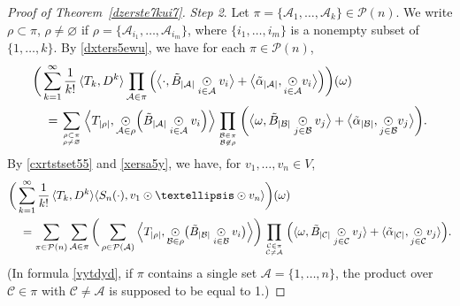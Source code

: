 \documentclass[10pt,a4paper]{amsart}
\begin{document}
\begin{proof}[Proof of Theorem~\ref{dzerste7kui7}]
{\it Step 2}. Let $\pi=\{\mathcal A_1,\dots,\mathcal A_k\}\in\mathcal P(n)$. We write $\rho\subset\pi$, $\rho\ne\varnothing$ if $\rho=\{\mathcal A_{i_1},\dots,\mathcal A_{i_m}\}$, where $\{i_1,\dots,i_m\}$ is a nonempty subset of $\{1,\dots,k\}$. By \eqref{dxters5ewu}, we have for each $\pi\in\mathcal P(n)$,
\begin{align}
&\bigg(\sum_{k=1}^\infty \frac 1{k!}\,\langle T_k, D^{k}\rangle \prod_{\mathcal A\in\pi}\Big(
\big\langle \cdot,\tilde B_{|\mathcal A|}\underset{i\in \mathcal A}\odot v_i\big\rangle+\big\langle \tilde\alpha_{|\mathcal A|},\underset{i\in \mathcal A}\odot v_i\big\rangle\Big)\bigg)(\omega)\notag\\
&\quad=\sum_{\rho\subset\pi\atop \rho\ne\varnothing}\Big\langle T_{|\rho|},
\underset{\mathcal A\in\rho}\odot\Big(\tilde B_{|\mathcal A|} \underset{i\in\mathcal A}\odot v_i\Big)\Big\rangle
\prod_{\mathcal B\in\pi\atop\mathcal B\not\in \rho}
\bigg(
\big\langle \omega,\tilde B_{|\mathcal B|}\underset{j\in \mathcal B}\odot v_j\big\rangle+\big\langle \tilde\alpha_{|\mathcal B|},\underset{j\in \mathcal B}\odot v_j\big\rangle\bigg).\label{xersa5y}
\end{align}
By \eqref{cxrtstset55} and \eqref{xersa5y}, we have, for  $v_1,\dots,v_n\in V$,
\begin{align}
&\bigg(\sum_{k=1}^\infty \frac 1{k!}\,\langle T_k, D^{k}\rangle\langle S_n(\cdot),v_1\odot\dots\odot v_n\rangle\bigg)(\omega)\notag\\ 
&\quad=\sum_{\pi\in\mathcal P(n)}\sum_{\mathcal A\in\pi}
\bigg(\sum_{\rho\in\mathcal P(\mathcal A)}\Big\langle T_{|\rho|},\underset{\mathcal B\in\rho}{\odot}\big(\tilde B_{|\mathcal B|}\underset{i\in\mathcal B}\odot v_i\big)\Big\rangle \bigg)
\prod_{{\mathcal C\in\pi}\atop{\mathcal C\ne\mathcal A}}\Big(\langle\omega,\tilde B_{|\mathcal C|}\underset{j\in\mathcal C}\odot v_j \rangle+\langle\tilde\alpha_{|\mathcal C|},
\underset{j\in\mathcal C}\odot v_j\rangle\Big).\label{vytdyd}
\end{align}
(In  formula \eqref{vytdyd}, if $\pi$ contains a single set $\mathcal A=\{1,\dots,n\}$, the product over $\mathcal C\in\pi$ with $\mathcal C\ne\mathcal A$ is supposed to be equal to 1.)


\end{proof}
\end{document}
